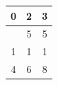 \documentclass[10pt,a4paper,twocolumn,showkeys,showpacs,aps,groupedaddress,noeprint]{revtex4-1}
\begin{document}

\begin{table}
\begin{center}
\begin{tabular}{c | c | c}
0 & 2 & 3\\ \hline
\rowcolor{cinza}\multicolumn{1}{c}{5} & \multicolumn{1}{c}{5} & \multicolumn{1}{c}{5} \\
\hline
\rowcolor[gray]{.8} 1 & 1 & 1\\
4 & 6 & 8
\end{tabular}
\end{center}
\end{table}
\end{document}

